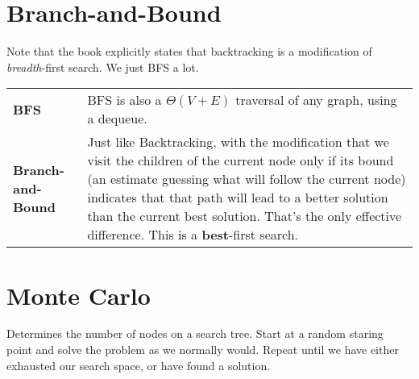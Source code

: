 \documentclass[aip, jmp, amsmath,amssymb, reprint]{revtex4-1}
\theoremstyle{definition}
\begin{document}
\section{Branch-and-Bound}
Note that the book explicitly states that backtracking is a modification of \textit{breadth}-first search. We just BFS a lot.
\begin{longtable}{p{2.2cm} p{6cm} }
    \textbf{BFS} & BFS is also a  $\Theta(V + E)$ traversal of any graph, using a dequeue.\\
    \textbf{Branch-and-Bound} & Just like Backtracking, with the modification that we visit the children of the current node only if its bound (an estimate guessing what will follow the current node) indicates that that path will lead to a better solution than the current best solution. That's the only effective difference. This is a \textbf{best}-first search.
\end{longtable}

\section{Monte Carlo}

Determines the number of nodes on a search tree. Start at a random staring point and solve the problem as we normally would. Repeat until 
we have either exhausted our search space, or have found a solution.
\end{document}
